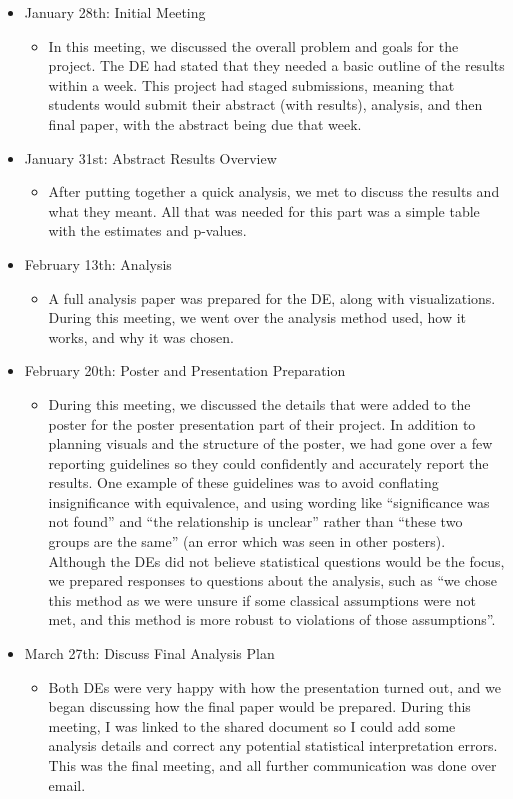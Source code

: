 \documentclass{article}
\begin{document}
\begin{itemize}
    \item January 28th: Initial Meeting
        \begin{itemize}
        \item In this meeting, we discussed the overall problem and goals for the project. The DE had stated that they needed a basic outline of the results within a week. This project had staged submissions, meaning that students would submit their abstract (with results), analysis, and then final paper, with the abstract being due that week.
        \end{itemize}
    \item January 31st: Abstract Results Overview
        \begin{itemize}
        \item After putting together a quick analysis, we met to discuss the results and what they meant. All that was needed for this part was a simple table with the estimates and p-values.
        \end{itemize}
    \item February 13th: Analysis 
        \begin{itemize}
        \item A full analysis paper was prepared for the DE, along with visualizations. During this meeting, we went over the analysis method used, how it works, and why it was chosen.
        \end{itemize}
    \item February 20th: Poster and Presentation Preparation 
        \begin{itemize}
        \item During this meeting, we discussed the details that were added to the poster for the poster presentation part of their project. In addition to planning visuals and the structure of the poster, we had gone over a few reporting guidelines so they could confidently and accurately report the results. One example of these guidelines was to avoid conflating insignificance with equivalence, and using wording like ``significance was not found'' and ``the relationship is unclear'' rather than ``these two groups are the same'' (an error which was seen in other posters). Although the DEs did not believe statistical questions would be the focus, we prepared responses to questions about the analysis, such as ``we chose this method as we were unsure if some classical assumptions were not met, and this method is more robust to violations of those assumptions''.
        \end{itemize} 
    \item March 27th: Discuss Final Analysis Plan
        \begin{itemize}
        \item Both DEs were very happy with how the presentation turned out, and we began discussing how the final paper would be prepared. During this meeting, I was linked to the shared document so I could add some analysis details and correct any potential statistical interpretation errors. This was the final meeting, and all further communication was done over email.
        \end{itemize} 
\end{itemize}
\end{document}
